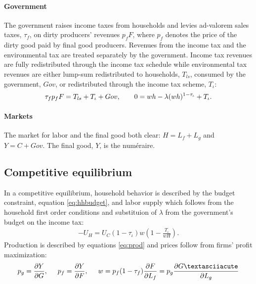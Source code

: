 \paragraph{Government}
The government raises income taxes from households and levies ad-valorem sales taxes, $\tau_f$, on dirty producers' revenues $p_fF$, where $p_f$ denotes the price of the dirty good paid by final good producers. Revenues from the income tax and the environmental tax are treated separately by the government. Income tax revenues are fully redistributed through the income tax schedule while environmental tax revenues are either lump-sum redistributed to households, $T_{ls}$, consumed by the government, $Gov$, or redistributed through the income tax scheme, $T_\iota$:
\begin{align}
\tau_{f}p_fF=T_{ls}+T_\iota+Gov, \hspace{7mm}
0={w h}-\lambda(w h)^{1-\tau_{\iota}}+T_\iota.
\end{align}

\paragraph{Markets}
The market for labor and the final good both clear: $H=L_f+L_g$ and $Y=C+Gov$. The final good, $Y$, is the numéraire.
\subsection{Competitive equilibrium}
In a competitive equilibrium, household behavior is described by the budget constraint, equation \ref{eq:hhbudget}, and labor supply which follows from the household first order conditions and substituion of $\lambda$ from the government's budget on the income tax:
\begin{align}
-U_H=U_C(1-\tau_{\iota})w\left(1-\frac{T_\iota}{wH}\right). \label{eq:hsup}
\end{align}
Production is described by equations \ref{eq:prod} and prices follow from firms' profit maximization:
\begin{align}
p_g=\frac{\partial Y}{\partial G}, \hspace{5mm}
p_f = \frac{\partial Y}{\partial F}, \hspace{5mm}
w= p_f(1-\tau_f)\frac{\partial F}{\partial L_f}=p_g\frac{\partial G´}{\partial L_g}\label{eq:profmax}
\end{align}

